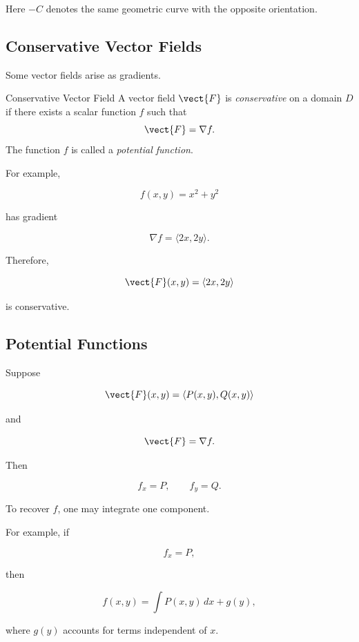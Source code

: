 Here \(-C\) denotes the same geometric curve with the opposite orientation.

\subsection{Conservative Vector Fields}
\label{subsec:conservative-vector-fields}

Some vector fields arise as gradients.

\begin{definitionbox}{Conservative Vector Field}
A vector field \(\vect{F}\) is \emph{conservative} on a domain \(D\) if
there exists a scalar function \(f\) such that
\[ \vect{F}=\nabla f. \]
The function \(f\) is called a \emph{potential function}.
\end{definitionbox}

For example,

\[ f(x,y)=x^2+y^2 \]

has gradient

\[ \nabla f=\langle2x,2y\rangle. \]

Therefore,

\[ \vect{F}(x,y)=\langle2x,2y\rangle \]

is conservative.

\subsection{Potential Functions}
\label{subsec:potential-functions}

Suppose

\[ \vect{F}(x,y)=\langle P(x,y),Q(x,y)\rangle \]

and

\[ \vect{F}=\nabla f. \]

Then

\[ f_x=P,\qquad f_y=Q. \]

To recover \(f\), one may integrate one component.

For example, if

\[ f_x=P, \]

then

\[ f(x,y)=\int P(x,y)\,dx+g(y), \]

where \(g(y)\) accounts for terms independent of \(x\).

